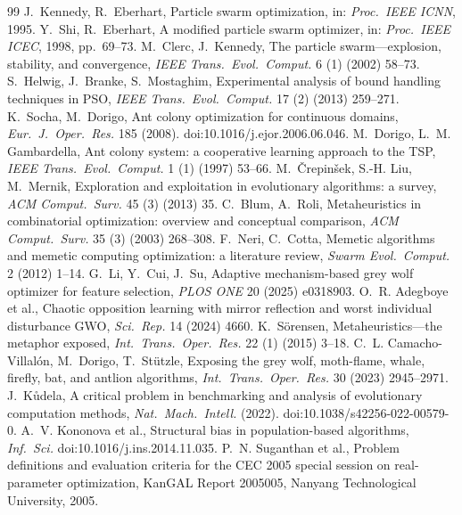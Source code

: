 \documentclass[10pt,journal,compsoc]{IEEEtran}
\begin{document}
\begin{thebibliography}{99}
 J.~Kennedy, R.~Eberhart, Particle swarm optimization, in: \emph{Proc.\ IEEE ICNN}, 1995.
 Y.~Shi, R.~Eberhart, A modified particle swarm optimizer, in: \emph{Proc.\ IEEE ICEC}, 1998, pp.~69--73.
 M.~Clerc, J.~Kennedy, The particle swarm---explosion, stability, and convergence, \emph{IEEE Trans.\ Evol.\ Comput.} 6 (1) (2002) 58--73.
 S.~Helwig, J.~Branke, S.~Mostaghim, Experimental analysis of bound handling techniques in PSO, \emph{IEEE Trans.\ Evol.\ Comput.} 17 (2) (2013) 259--271.
 K.~Socha, M.~Dorigo, Ant colony optimization for continuous domains, \emph{Eur.\ J.\ Oper.\ Res.} 185 (2008). doi:10.1016/j.ejor.2006.06.046.
 M.~Dorigo, L.~M. Gambardella, Ant colony system: a cooperative learning approach to the TSP, \emph{IEEE Trans.\ Evol.\ Comput.} 1 (1) (1997) 53--66.
 M.~\v{C}repin\v{s}ek, S.-H. Liu, M.~Mernik, Exploration and exploitation in evolutionary algorithms: a survey, \emph{ACM Comput.\ Surv.} 45 (3) (2013) 35.
 C.~Blum, A.~Roli, Metaheuristics in combinatorial optimization: overview and conceptual comparison, \emph{ACM Comput.\ Surv.} 35 (3) (2003) 268--308.
 F.~Neri, C.~Cotta, Memetic algorithms and memetic computing optimization: a literature review, \emph{Swarm Evol.\ Comput.} 2 (2012) 1--14.
 G.~Li, Y.~Cui, J.~Su, Adaptive mechanism-based grey wolf optimizer for feature selection, \emph{PLOS ONE} 20 (2025) e0318903.
 O.~R. Adegboye et al., Chaotic opposition learning with mirror reflection and worst individual disturbance GWO, \emph{Sci.\ Rep.} 14 (2024) 4660.
 K.~S\"orensen, Metaheuristics---the metaphor exposed, \emph{Int.\ Trans.\ Oper.\ Res.} 22 (1) (2015) 3--18.
 C.~L. Camacho-Villal\'on, M.~Dorigo, T.~St\"utzle, Exposing the grey wolf, moth-flame, whale, firefly, bat, and antlion algorithms, \emph{Int.\ Trans.\ Oper.\ Res.} 30 (2023) 2945--2971.
 J.~K\r{u}dela, A critical problem in benchmarking and analysis of evolutionary computation methods, \emph{Nat.\ Mach.\ Intell.} (2022). doi:10.1038/s42256-022-00579-0.
 A.~V. Kononova et al., Structural bias in population-based algorithms, \emph{Inf.\ Sci.} doi:10.1016/j.ins.2014.11.035.
 P.~N. Suganthan et al., Problem definitions and evaluation criteria for the CEC 2005 special session on real-parameter optimization, KanGAL Report 2005005, Nanyang Technological University, 2005.

\end{thebibliography}
\end{document}
